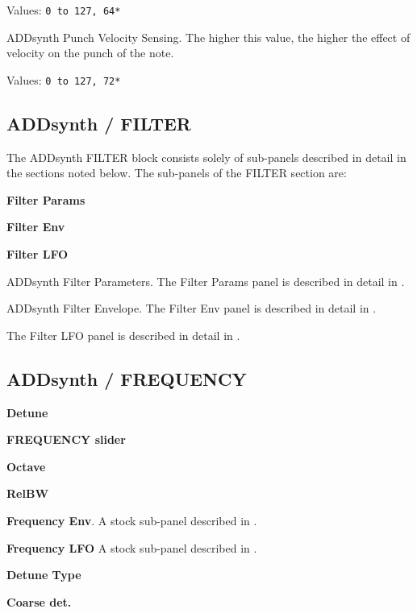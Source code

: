    Values: \texttt{0 to 127, 64*}

   ADDsynth Punch Velocity Sensing.
   The higher this value, the higher the effect of velocity on the punch of
   the note.

   Values: \texttt{0 to 127, 72*}

\subsection{ADDsynth / FILTER}
\label{subsec:addsynth_filter}

   The ADDsynth FILTER block consists solely of sub-panels
   described in detail in the sections noted below.  The
   sub-panels of the FILTER section are:

   \begin{enumber}
      \item \textbf{Filter Params}
      \item \textbf{Filter Env}
      \item \textbf{Filter LFO}
   \end{enumber}

   \setcounter{ItemCounter}{0}      %

   ADDsynth Filter Parameters.
   The Filter Params panel is described in detail in
   .

   ADDsynth Filter Envelope.
   The Filter Env panel is described in detail in
   .

   The Filter LFO panel is described in detail in
   .

\subsection{ADDsynth / FREQUENCY}
\label{subsec:addsynth_frequency}

   \begin{enumber}
      \item \textbf{Detune}
      \item \textbf{FREQUENCY slider}
      \item \textbf{Octave}
      \item \textbf{RelBW}
      \item \textbf{Frequency Env}.
         A stock sub-panel described in
         .
      \item \textbf{Frequency LFO}
         A stock sub-panel described in
         .
      \item \textbf{Detune Type}
      \item \textbf{Coarse det.}
   \end{enumber}


